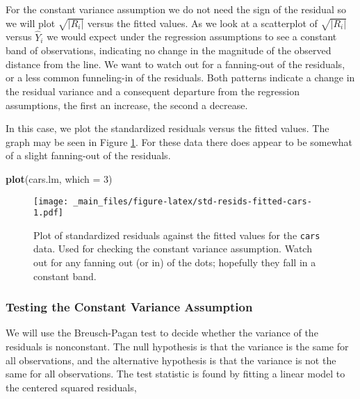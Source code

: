 \documentclass[]{book}
\newenvironment{Shaded}{\begin{snugshade}}{\end{snugshade}}
\newcommand{\KeywordTok}[1]{\textcolor[rgb]{0.13,0.29,0.53}{\textbf{{#1}}}}
\newcommand{\DataTypeTok}[1]{\textcolor[rgb]{0.13,0.29,0.53}{{#1}}}
\newcommand{\DecValTok}[1]{\textcolor[rgb]{0.00,0.00,0.81}{{#1}}}
\newcommand{\NormalTok}[1]{{#1}}
\numberwithin{equation}{chapter}
\numberwithin{figure}{chapter}
\theoremstyle{plain}
\theoremstyle{definition}
\theoremstyle{remark}
\theoremstyle{definition}
\theoremstyle{definition}
\theoremstyle{remark}
\begin{document}
For the constant variance assumption we do not need the sign of the
residual so we will plot \(\sqrt{|R_{i}|}\) versus the fitted values. As
we look at a scatterplot of \(\sqrt{|R_{i}|}\) versus \(\hat{Y}_{i}\) we
would expect under the regression assumptions to see a constant band of
observations, indicating no change in the magnitude of the observed
distance from the line. We want to watch out for a fanning-out of the
residuals, or a less common funneling-in of the residuals. Both patterns
indicate a change in the residual variance and a consequent departure
from the regression assumptions, the first an increase, the second a
decrease.

In this case, we plot the standardized residuals versus the fitted
values. The graph may be seen in Figure
\ref{fig:std-resids-fitted-cars}. For these data there does appear to be
somewhat of a slight fanning-out of the residuals.

\begin{Shaded}
\begin{Highlighting}[]
\KeywordTok{plot}\NormalTok{(cars.lm, }\DataTypeTok{which =} \DecValTok{3}\NormalTok{)}
\end{Highlighting}
\end{Shaded}

\begin{figure}[htbp]
\centering
\texttt{[image: \_main\_files/figure-latex/std-resids-fitted-cars-1.pdf]}
\caption{\label{fig:std-resids-fitted-cars}\small Plot of standardized residuals
against the fitted values for the \texttt{cars} data. Used for checking
the constant variance assumption. Watch out for any fanning out (or in)
of the dots; hopefully they fall in a constant band.}
\end{figure}






\subsubsection{Testing the Constant Variance
Assumption}\label{testing-the-constant-variance-assumption}

We will use the Breusch-Pagan test to decide whether the variance of the
residuals is nonconstant. The null hypothesis is that the variance is
the same for all observations, and the alternative hypothesis is that
the variance is not the same for all observations. The test statistic is
found by fitting a linear model to the centered squared residuals,
\end{document}
